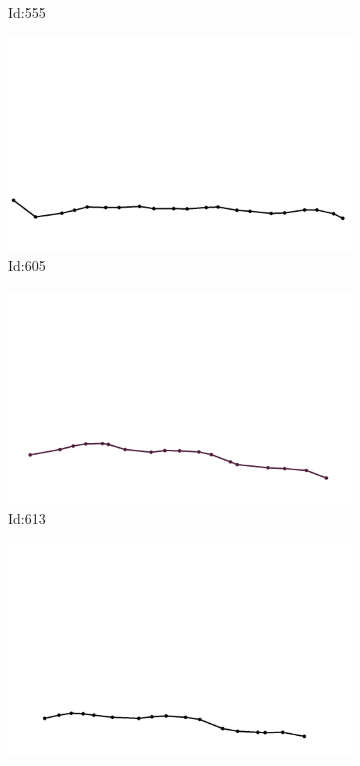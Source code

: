 \documentclass[12pt,twoside]{report}
\begin{document}
\begin{figure}
\begin{subfigure}[b]{0.20\textwidth}
\caption{Id:555}
\end{subfigure}
\begin{subfigure}[b]{0.20\textwidth}
\centering
\includegraphics[width=\textwidth]{../trajectories/605.png}
\caption{Id:605}
\end{subfigure}
\begin{subfigure}[b]{0.20\textwidth}
\centering
\includegraphics[width=\textwidth]{../trajectories/613.png}
\caption{Id:613}
\end{subfigure}
\begin{subfigure}[b]{0.20\textwidth}
\centering
\includegraphics[width=\textwidth]{../trajectories/675.png}

\end{subfigure}
\end{figure}
\end{document}
